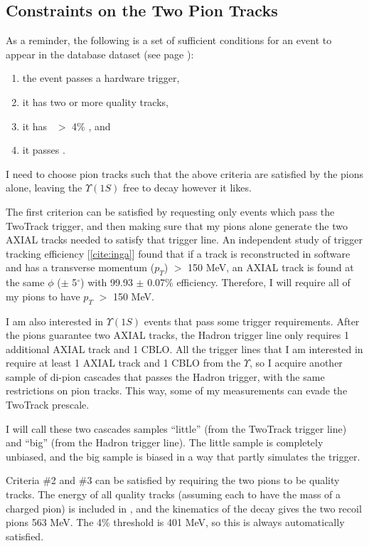 \subsection{Constraints on the Two Pion Tracks}

As a reminder, the following is a set of sufficient conditions for an
event to appear in the database dataset (see page
\pageref{wonderfuldiscovery}):
\begin{enumerate}
  \item the event passes a hardware trigger,
  \item it has two or more quality tracks,
  \item it has \hotvisen\ $>$ 4\% \ecom, and
  \item it passes \lfourdec.
\end{enumerate}
I need to choose pion tracks such that the above criteria are
satisfied by the pions alone, leaving the $\Upsilon(1S)$ free to decay
however it likes.

The first criterion can be satisfied by requesting only events which
pass the TwoTrack trigger, and then making sure that my pions alone
generate the two AXIAL tracks needed to satisfy that trigger line.  An
independent study of trigger tracking efficiency [\ref{cite:inga}]
found that if a track is reconstructed in software and has a
transverse momentum ($p_T$) $>$ 150 MeV, an AXIAL track is found at
the same $\phi$ ($\pm$ 5$^\circ$) with 99.93 $\pm$ 0.07\% efficiency.
Therefore, I will require all of my pions to have $p_T$ $>$ 150 MeV.

I am also interested in $\Upsilon(1S)$ events that pass some trigger
requirements.  After the pions guarantee two AXIAL tracks, the Hadron
trigger line only requires 1 additional AXIAL track and 1 CBLO.  All
the trigger lines that I am interested in require at least 1 AXIAL
track and 1 CBLO from the $\Upsilon$, so I acquire another sample of
di-pion cascades that passes the Hadron trigger, with the same
restrictions on pion tracks.  This way, some of my measurements can
evade the TwoTrack prescale.

I will call these two cascades samples ``little'' (from the TwoTrack
trigger line) and ``big'' (from the Hadron trigger line).  The little
sample is completely unbiased, and the big sample is biased in a way
that partly simulates the trigger.

Criteria \#2 and \#3 can be satisfied by requiring the two pions to be
quality tracks.  The energy of all quality tracks (assuming each to
have the mass of a charged pion) is included in \visen, and the
kinematics of the decay gives the two recoil pions 563 MeV.  The 4\%
threshold is 401 MeV, so this is always automatically satisfied.

